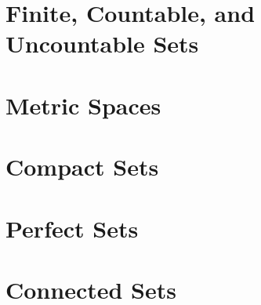 
\section{Finite, Countable, and Uncountable Sets}\label{sec:finite-countable-and-uncountable-sets}


\section{Metric Spaces}\label{sec:metric-spaces}


\section{Compact Sets}\label{sec:compact-sets}


\section{Perfect Sets}\label{sec:perfect-sets}


\section{Connected Sets}\label{sec:connected-sets}

